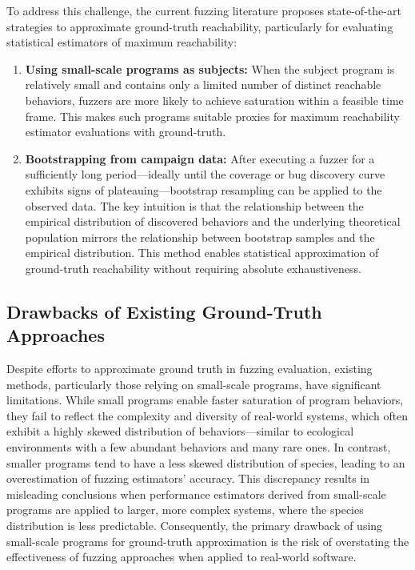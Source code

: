 \documentclass[conference]{IEEEtran}
\begin{document}
To address this challenge, the current fuzzing literature proposes state-of-the-art strategies to approximate ground-truth reachability, particularly for evaluating statistical estimators of maximum reachability:

\begin{enumerate}
    \item \textbf{Using small-scale programs as subjects:} When the subject program is relatively small and contains only a limited number of distinct reachable behaviors, fuzzers are more likely to achieve saturation within a feasible time frame. This makes such programs suitable proxies for maximum reachability estimator evaluations with ground-truth.
    
    \item \textbf{Bootstrapping from campaign data:} After executing a fuzzer for a sufficiently long period—ideally until the coverage or bug discovery curve exhibits signs of plateauing—bootstrap resampling can be applied to the observed data. The key intuition is that the relationship between the empirical distribution of discovered behaviors and the underlying theoretical population mirrors the relationship between bootstrap samples and the empirical distribution. This method enables statistical approximation of ground-truth reachability without requiring absolute exhaustiveness.
\end{enumerate}

\subsection{Drawbacks of Existing Ground-Truth Approaches}

Despite efforts to approximate ground truth in fuzzing evaluation, existing methods, particularly those relying on small-scale programs, have significant limitations. While small programs enable faster saturation of program behaviors, they fail to reflect the complexity and diversity of real-world systems, which often exhibit a highly skewed distribution of behaviors—similar to ecological environments with a few abundant behaviors and many rare ones. In contrast, smaller programs tend to have a less skewed distribution of species, leading to an overestimation of fuzzing estimators’ accuracy. This discrepancy results in misleading conclusions when performance estimators derived from small-scale programs are applied to larger, more complex systems, where the species distribution is less predictable. Consequently, the primary drawback of using small-scale programs for ground-truth approximation is the risk of overstating the effectiveness of fuzzing approaches when applied to real-world software.
\end{document}
